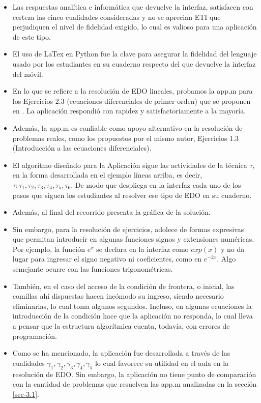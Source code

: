 \documentclass[spanish]{textolivre}
\begin{document}
\begin{itemize}
\item Las respuestas analítica e informática que devuelve la interfaz, satisfacen con certeza las cinco cualidades consideradas y no se aprecian ETI que perjudiquen el nivel de fidelidad exigido, lo cual es valioso para una aplicación de este tipo.
\item El uso de LaTex en Python fue la clave para asegurar la fidelidad del lenguaje usado por los estudiantes en su cuaderno respecto del que devuelve la interfaz del móvil. 
\item En lo que se refiere a la resolución de EDO lineales, probamos la app.m para los Ejercicios 2.3 (ecuaciones diferenciales de primer orden) que se proponen en \textcite[p. 62-63]{zill2018}. La aplicación respondió con rapidez y satisfactoriamente a la mayoría. 
\item Además, la app.m es confiable como apoyo alternativo en la resolución de problemas reales, como los propuestos por el mismo autor, Ejercicios 1.3 (Introducción a las ecuaciones diferenciales).
\item El algoritmo diseñado para la Aplicación sigue las actividades de la técnica $\tau$, en la forma desarrollada en el ejemplo líneas arriba, es decir, $\tau: \tau_1, \tau_2, \tau_3, \tau_4, \tau_5, \tau_6$. De modo que despliega en la interfaz cada uno de los pasos que siguen los estudiantes al resolver ese tipo de EDO en su cuaderno.
\item Además, al final del recorrido presenta la gráfica de la solución.
\item Sin embargo, para la resolución de ejercicios, adolece de formas expresivas que permitan introducir en algunas funciones signos y extensiones numéricas. Por ejemplo, la función $e^{x}$ se declara en la interfaz como $exp(x)$ y no da lugar para ingresar el signo negativo ni coeficientes, como en $e^{-2x}$. Algo semejante ocurre con las funciones trigonométricas. 
\item También, en el caso del acceso de la condición de frontera, o inicial, las comillas ahí dispuestas hacen incómodo su ingreso, siendo necesario eliminarlas, lo cual toma algunos segundos. Incluso, en algunas ecuaciones la introducción de la condición hace que la aplicación no responda, lo cual lleva a pensar que la estructura algorítmica cuenta, todavía, con errores de programación.
\item Como se ha mencionado, la aplicación fue desarrollada a través de las cualidades $\gamma_1, \gamma_2, \gamma_3, \gamma_4, \gamma_5$ lo cual favorece su utilidad en el aula en la resolución de EDO. Sin embargo, la aplicación no tiene punto de comparación con la cantidad de problemas que resuelven las app.m analizadas en la sección \ref{sec-3.1}.
\end{itemize}
\end{document}
